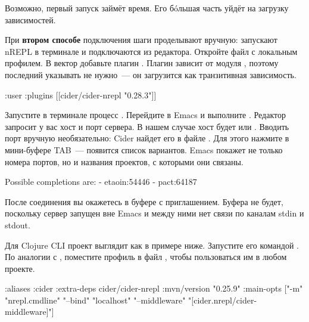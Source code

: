 
Возможно, первый запуск  займёт время. Его бóльшая часть уйдёт на загрузку зависимостей.

При \textbf{втором способе} подключения шаги проделывают вручную: запускают nREPL в терминале и подключаются из редактора. Откройте файл  с локальным профилем. В вектор  \arr {} добавьте плагин . Плагин зависит от модуля , поэтому последний указывать не нужно~--- он загрузится как транзитивная зависимость.

\begin{english}
  \begin{clojure}
{:user
 {:plugins
  [[cider/cider-nrepl "0.28.3"]]}}
  \end{clojure}
\end{english}


Запустите в терминале процесс . Перейдите в Emacs и выполните . Редактор запросит у вас хост и порт сервера. В нашем случае хост будет  или . Вводить порт вручную необязательно: Cider найдет его в файле . Для этого нажмите в мини-буфере TAB~--- появится список вариантов. Emacs покажет не только номера портов, но и названия проектов, с которыми они связаны.

\begin{english}
  \begin{text}
Possible completions are:
- etaoin:54446
- pact:64187
  \end{text}
\end{english}

После соединения вы окажетесь в буфере  с приглашением. Буфера  не будет, поскольку сервер запущен вне Emacs и между ними нет связи по каналам stdin и stdout.

Для Clojure CLI проект выглядит как в примере ниже. Запустите его командой . По аналогии с , поместите профиль  в файл , чтобы пользоваться им в любом проекте.

\begin{english}
  \begin{clojure}
{:aliases
 {:cider
  {:extra-deps
   {cider/cider-nrepl {:mvn/version "0.25.9"}}
   :main-opts
   ["-m" "nrepl.cmdline"
    "--bind" "localhost"
    "--middleware" "[cider.nrepl/cider-middleware]"]}}}
  \end{clojure}
\end{english}

